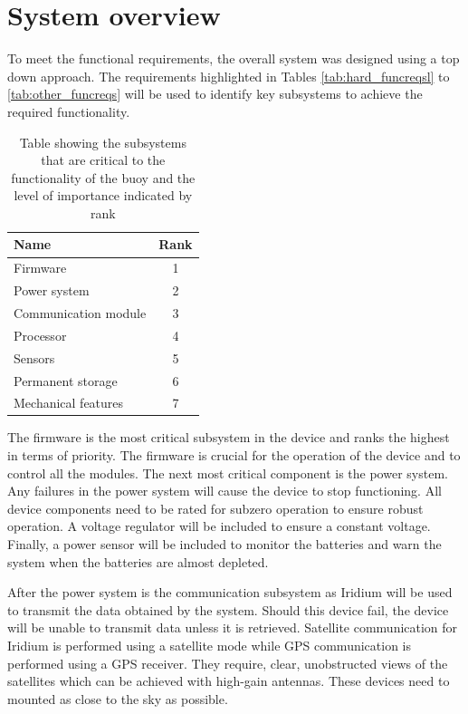 \section{System overview}
\label{sec:ch3_sysoverview}
To meet the functional requirements, the overall system was designed using a top down approach. The requirements highlighted in Tables \ref{tab:hard_funcreqsl} to \ref{tab:other_funcreqs} will be used to identify key subsystems to achieve the required functionality.

\begin{table}[H]
    \centering
    \caption{Table showing the subsystems that are critical to the functionality of the buoy and the level of importance indicated by rank}
    \setlength{\extrarowheight}{2.5pt}
    \begin{tabular}{l c }
    \hline
    \textbf{Name}  & \textbf{Rank}\\
    \hline
    \hline
    Firmware & 1\\
    \hline
    Power system & 2 \\
    \hline
    Communication module  & 3\\
    \hline
    Processor & 4\\
    \hline
    Sensors & 5\\
    \hline
    Permanent storage  & 6 \\
    \hline
    Mechanical features & 7 \\
    \hline
    \hline
    \end{tabular}

    \label{tab:subsys}
\end{table}

The firmware is the most critical subsystem in the device and ranks the highest in terms of priority. The firmware is crucial for the operation of the device and to control all the modules. The next most critical component is the power system. Any failures in the power system will cause the device to stop functioning.  All device components need to be rated for subzero operation to ensure robust operation. A voltage regulator will be included to ensure a constant voltage. Finally, a power sensor will be included to monitor the batteries and warn the system when the batteries are almost depleted. \par 

After the power system is the communication subsystem as Iridium will be used to transmit the data obtained by the system. Should this device fail, the device will be unable to transmit data unless it is retrieved. Satellite communication for Iridium is performed using a satellite mode while GPS communication is performed using a GPS receiver. They require, clear, unobstructed views of the satellites which can be achieved with high-gain antennas. These devices need to mounted as close to the sky as possible.\par

